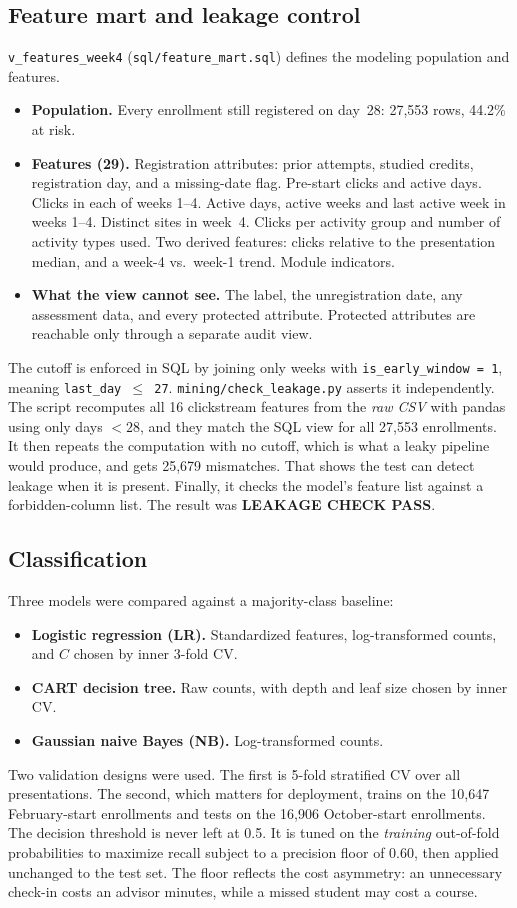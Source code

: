 \documentclass[10pt,letterpaper]{article}
\renewcommand{\tt}[1]{\texttt{#1}}
\begin{document}
\subsection{Feature mart and leakage control}
\tt{v\_features\_week4} (\tt{sql/feature\_mart.sql}) defines the modeling population and features.
\begin{itemize}
\item \textbf{Population.} Every enrollment still registered on day~28: 27,553 rows, 44.2\% at risk.
\item \textbf{Features (29).} Registration attributes: prior attempts, studied credits, registration day, and a
missing-date flag. Pre-start clicks and active days. Clicks in each of weeks 1--4. Active days, active weeks and
last active week in weeks 1--4. Distinct sites in week~4. Clicks per activity group and number of activity types
used. Two derived features: clicks relative to the presentation median, and a week-4 vs.\ week-1 trend. Module
indicators.
\item \textbf{What the view cannot see.} The label, the unregistration date, any assessment data, and every
protected attribute. Protected attributes are reachable only through a separate audit view.
\end{itemize}
The cutoff is enforced in SQL by joining only weeks with \tt{is\_early\_window = 1}, meaning
\tt{last\_day $\le$ 27}. \tt{mining/check\_leakage.py} asserts it independently. The script recomputes all 16
clickstream features from the \emph{raw CSV} with pandas using only days $< 28$, and they match the SQL view for
all 27,553 enrollments. It then repeats the computation with no cutoff, which is what a leaky pipeline would
produce, and gets 25,679 mismatches. That shows the test can detect leakage when it is present. Finally, it checks
the model's feature list against a forbidden-column list. The result was \textbf{LEAKAGE CHECK PASS}.

\subsection{Classification}
Three models were compared against a majority-class baseline:
\begin{itemize}
\item \textbf{Logistic regression (LR).} Standardized features, log-transformed counts, and $C$ chosen by inner
3-fold CV.
\item \textbf{CART decision tree.} Raw counts, with depth and leaf size chosen by inner CV.
\item \textbf{Gaussian naive Bayes (NB).} Log-transformed counts.
\end{itemize}
Two validation designs were used. The first is 5-fold stratified CV over all presentations. The second, which
matters for deployment, trains on the 10,647 February-start enrollments and tests on the 16,906 October-start
enrollments. The decision threshold is never left at 0.5. It is tuned on the \emph{training} out-of-fold
probabilities to maximize recall subject to a precision floor of 0.60, then applied unchanged to the test set. The
floor reflects the cost asymmetry: an unnecessary check-in costs an advisor minutes, while a missed student may
cost a course.
\end{document}
